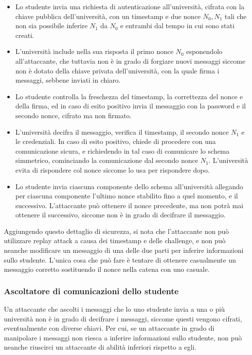\documentclass[a4paper,12pt]{article}
\begin{document}
\begin{itemize}
    \item Lo studente invia una richiesta di autenticazione all'università, cifrata con la chiave pubblica dell'università, con un timestamp e due nonce \texttt{$N_0,N_1$} tali che non sia possibile inferire \texttt{$N_1$} da \texttt{$N_0$} e entrambi dal tempo in cui sono stati creati.
    \item L'università include nella sua risposta il primo nonce \texttt{$N_0$} esponendolo all'attaccante, che tuttavia non è in grado di forgiare nuovi messaggi siccome non è dotato della chiave privata dell'università, con la quale firma i messaggi, sebbene inviati in chiaro.
    \item Lo studente controlla la freschezza del timestamp, la correttezza del nonce e della firma, ed in caso di esito positivo invia il messaggio con la password e il secondo nonce, cifrato ma non firmato.
    \item L'università decifra il messaggio, verifica il timestamp, il secondo nonce \texttt{$N_1$} e le credenziali. In caso di esito positivo, chiede di procedere con una comunicazione sicura, e richiedendo in tal caso di comunicare lo schema simmetrico, cominciando la comunicazione dal secondo nonce \texttt{$N_1$}. L'università evita di rispondere col nonce siccome lo usa per rispondere dopo.
    \item Lo studente invia ciascuna componente dello schema all'università allegando per ciascuna componente l'ultimo nonce stabilito fino a quel momento, e il successivo. L'attaccante può ottenere il nonce precedente, ma non potrà mai ottenere il successivo, siccome non è in grado di decifrare il messaggio.
\end{itemize}
Aggiungendo questo dettaglio di sicurezza, si nota che l'attaccante non può utilizzare replay attack a causa dei timestamp e delle challenge, e non può neanche modificare un messaggio di una delle due parti per inferire informazioni sullo studente. L'unica cosa che può fare è tentare di ottenere casualmente un messaggio corretto sostituendo il nonce nella catena con uno casuale.
\subsubsection{Ascoltatore di comunicazioni dello studente}
Un attaccante che ascolti i messaggi che lo uno studente invia a una o più università non è in grado di decifrare i messaggi, siccome questi vengono cifrati, eventualmente con diverse chiavi. Per cui, se un attaccante in grado di manipolare i messaggi non riesca a inferire informazioni sullo studente, non può neanche riuscirci un attaccante di abilità inferiori rispetto a egli.
\end{document}
